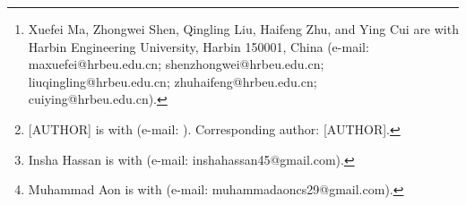 \author{Xuefei~Ma,
        Ghulam~Ali,
        Zhongwei~Shen,
        Insha~Hassan,
        Muhammad~Aon,
        Qingling~Liu,
        Haifeng~Zhu,
        and~Ying~Cui%
\thanks{Xuefei Ma, Zhongwei Shen, Qingling Liu, Haifeng Zhu, and Ying Cui
are with Harbin Engineering University, Harbin 150001, China
(e-mail: maxuefei@hrbeu.edu.cn; shenzhongwei@hrbeu.edu.cn;
liuqingling@hrbeu.edu.cn; zhuhaifeng@hrbeu.edu.cn;
cuiying@hrbeu.edu.cn).}%
\thanks{[AUTHOR] is with  (e-mail: ). Corresponding author: [AUTHOR].}%
\thanks{Insha Hassan is with  (e-mail: inshahassan45@gmail.com).}%
\thanks{Muhammad Aon is with  (e-mail: muhammadaoncs29@gmail.com).}}
